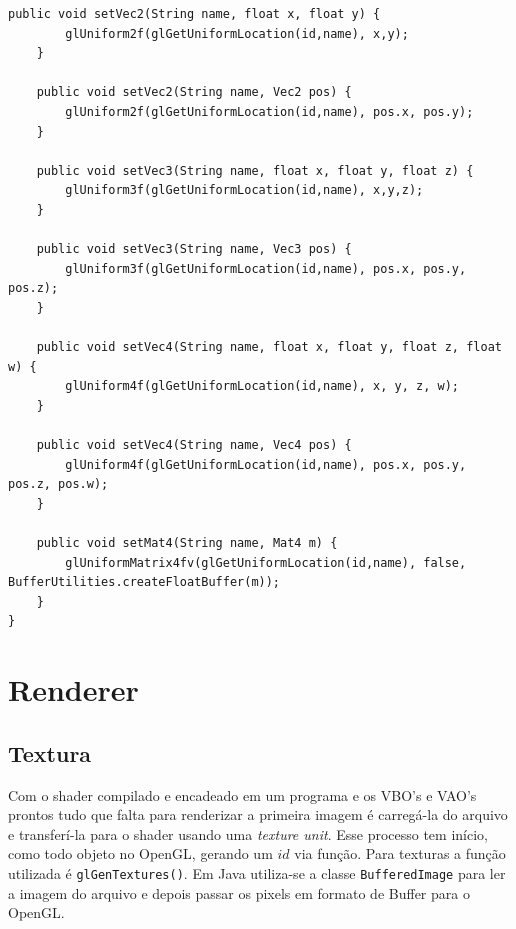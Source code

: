 \documentclass[12pt, 
openright, 
oneside, 
a4paper,    
brazil]{facom-ufu-abntex2}
\begin{document}
\begin{lstlisting}[caption=Shader class]
	public void setVec2(String name, float x, float y) {
		glUniform2f(glGetUniformLocation(id,name), x,y);
	}
	
	public void setVec2(String name, Vec2 pos) {
		glUniform2f(glGetUniformLocation(id,name), pos.x, pos.y);
	}
	
	public void setVec3(String name, float x, float y, float z) {
		glUniform3f(glGetUniformLocation(id,name), x,y,z);
	}
	
	public void setVec3(String name, Vec3 pos) {
		glUniform3f(glGetUniformLocation(id,name), pos.x, pos.y, pos.z);
	}
	
	public void setVec4(String name, float x, float y, float z, float w) {
		glUniform4f(glGetUniformLocation(id,name), x, y, z, w);
	}
	
	public void setVec4(String name, Vec4 pos) {
		glUniform4f(glGetUniformLocation(id,name), pos.x, pos.y, pos.z, pos.w);
	}

	public void setMat4(String name, Mat4 m) {
		glUniformMatrix4fv(glGetUniformLocation(id,name), false, BufferUtilities.createFloatBuffer(m));
	}
}
\end{lstlisting}
\section{Renderer}
\subsection{Textura}
Com o shader compilado e encadeado em um programa e os VBO's e VAO's prontos tudo que falta para renderizar a primeira imagem é carregá-la do arquivo e transferí-la para o shader usando uma \textit{texture unit}. Esse processo tem início, como todo objeto no OpenGL, gerando um $id$ via função. Para texturas a função utilizada é \texttt{glGenTextures()}. Em Java utiliza-se a classe \texttt{BufferedImage} para ler a imagem do arquivo e depois passar os pixels em formato de Buffer para o OpenGL.
\end{document}
